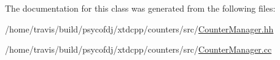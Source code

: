 The documentation for this class was generated from the following files\-:\begin{DoxyCompactItemize}
\item 
/home/travis/build/psycofdj/xtdcpp/counters/src/\hyperlink{CounterManager_8hh}{Counter\-Manager.\-hh}\item 
/home/travis/build/psycofdj/xtdcpp/counters/src/\hyperlink{CounterManager_8cc}{Counter\-Manager.\-cc}\end{DoxyCompactItemize}
